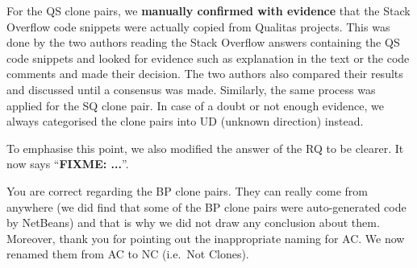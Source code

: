 \documentclass[a4paper,twoside,10pt]{reviewresponse}
\newcommand\FIXME[1]{{\color{red}\textbf{FIXME: #1}}}
\begin{document}
For the QS clone pairs, we \textbf{manually confirmed with evidence} that the Stack Overflow code snippets were actually copied from Qualitas projects. This was done by the two authors reading the Stack Overflow answers containing the QS code snippets and looked for evidence such as explanation in the text or the code comments and made their decision. The two authors also compared their results and discussed until a consensus was made. Similarly, the same process was applied for the SQ clone pair. 
In case of a doubt or not enough evidence, we always categorised the clone pairs into UD (unknown direction) instead. 

To emphasise this point, we also modified the answer of the RQ to be clearer. It now says ``\FIXME{...}''.


You are correct regarding the BP clone pairs. They can really come from anywhere (we did find that some of the BP clone pairs were auto-generated code by NetBeans) and that is why we did not draw any conclusion about them. 
Moreover, thank you for pointing out the inappropriate naming for AC. We now renamed them from AC to NC (i.e.~Not Clones).

\end{document}
